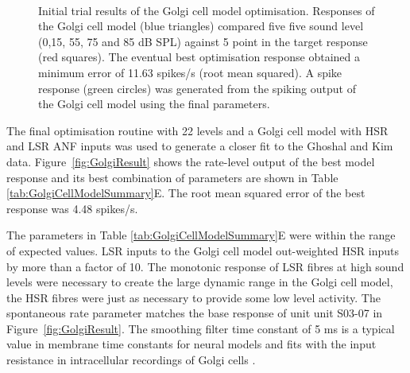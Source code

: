 \begin{figure}[htb]
  \centering
  \\
  \caption{Initial trial results of the Golgi cell model optimisation.
    Responses of the Golgi cell model (blue triangles) compared five five sound
    level (0,15, 55, 75 and 85 dB SPL) against 5 point in the target response
    (red squares). The eventual best optimisation response obtained a minimum
    error of 11.63 spikes/s (root mean squared). A spike response (green
    circles) was generated from the spiking output of the Golgi cell model using
    the final parameters.  }\label{fig:GolgiTestResult}
\end{figure}

The final optimisation routine with 22 levels and a Golgi cell model with HSR
and LSR ANF inputs was used to generate a closer fit to the Ghoshal and Kim
data. Figure~\ref{fig:GolgiResult} shows the rate-level output of the best model
response and its best combination of parameters are shown in Table
\ref{tab:GolgiCellModelSummary}E. The root mean squared error of the best
response was 4.48 spikes/s.

The parameters in Table \ref{tab:GolgiCellModelSummary}E were within the range
of expected values. LSR inputs to the Golgi cell model out-weighted HSR inputs
by more than a factor of 10. The monotonic response of LSR fibres at high sound
levels were necessary to create the large dynamic range in the Golgi cell model,
the HSR fibres were just as necessary to provide some low level activity. The
spontaneous rate parameter matches the base response of unit unit S03-07 in
Figure~\ref{fig:GolgiResult}. The smoothing filter time constant of 5 ms is a
typical value in membrane time constants for neural models and fits with the
input resistance in intracellular recordings of Golgi cells
\citep{FerragamoGoldingEtAl:1998}.  


